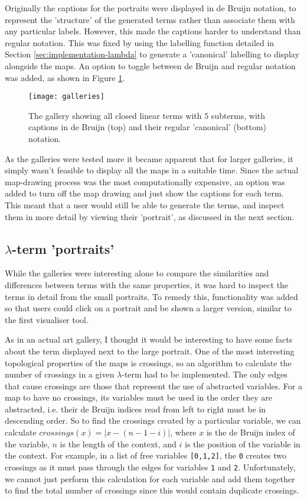 \documentclass[11pt]{article}
\begin{document}
Originally the captions for the portraits were displayed in de Bruijn notation, to represent the 'structure' of the generated terms rather than associate them with any particular labels. However, this made the captions harder to understand than regular notation. This was fixed by using the labelling function detailed in Section \ref{sec:implementation-lambda} to generate a 'canonical' labelling to display alongside the maps. An option to toggle between de Bruijn and regular notation was added, as shown in Figure \ref{fig:galleries}.

\begin{figure}
    \centering
    \texttt{[image: galleries]}
    \caption{The gallery showing all closed linear terms with 5 subterms, with captions in de Bruijn (top) and their regular 'canonical' (bottom) notation.}
    \label{fig:galleries}
\end{figure}

As the galleries were tested more it became apparent that for larger galleries, it simply wasn't feasible to display all the maps in a suitable time. Since the actual map-drawing process was the most computationally expensive, an option was added to turn off the map drawing and just show the captions for each term. This meant that a user would still be able to generate the terms, and inspect them in more detail by viewing their 'portrait', as discussed in the next section. 

\subsection{\texorpdfstring{$\lambda$}{Lambda}-term 'portraits'}
While the galleries were interesting alone to compare the similarities and differences between terms with the same properties, it was hard to inspect the terms in detail from the small portraits. To remedy this, functionality was added so that users could click on a portrait and be shown a larger version, similar to the first visualiser tool.

As in an actual art gallery, I thought it would be interesting to have some facts about the term displayed next to the large portrait. One of the most interesting topological properties of the maps is crossings, so an algorithm to calculate the number of crossings in a given $\lambda$-term had to be implemented. The only edges that cause crossings are those that represent the use of abstracted variables. For a map to have no crossings, its variables must be used in the order they are abstracted, i.e. their de Bruijn indices read from left to right must be in descending order. So to find the crossings created by a particular variable, we can calculate $crossings(x) = |x - (n - 1 - i)|$, where $x$ is the de Bruijn index of the variable, $n$ is the length of the context, and $i$ is the position of the variable in the context. For example, in a list of free variables \texttt{[0,1,2]}, the \texttt{0} creates two crossings as it must pass through the edges for variables \texttt{1} and \texttt{2}. Unfortunately, we cannot just perform this calculation for each variable and add them together to find the total number of crossings since this would contain duplicate crossings. 
\end{document}
